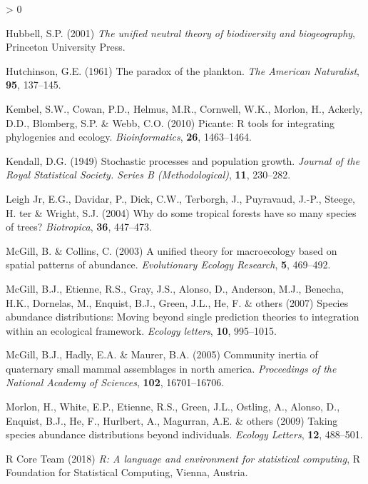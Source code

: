 \documentclass[
]{article}
\newlength{\cslhangindent}
\newenvironment{CSLReferences}[2] %
 {%
  \setlength{\parindent}{0pt}
  \ifodd #1 \everypar{\setlength{\hangindent}{\cslhangindent}}\ignorespaces\fi
  \ifnum #2 > 0
  \setlength{\parskip}{#2\baselineskip}
  \fi
 }%
 {}
\begin{document}
\begin{CSLReferences}{1}{0}
\leavevmode\hypertarget{ref-hubbell2001}{}%
Hubbell, S.P. (2001) \emph{The unified neutral theory of biodiversity
and biogeography}, Princeton University Press.

\leavevmode\hypertarget{ref-hutchinson1961}{}%
Hutchinson, G.E. (1961) The paradox of the plankton. \emph{The American
Naturalist}, \textbf{95}, 137--145.

\leavevmode\hypertarget{ref-picante}{}%
Kembel, S.W., Cowan, P.D., Helmus, M.R., Cornwell, W.K., Morlon, H.,
Ackerly, D.D., Blomberg, S.P. \& Webb, C.O. (2010) Picante: R tools for
integrating phylogenies and ecology. \emph{Bioinformatics}, \textbf{26},
1463--1464.

\leavevmode\hypertarget{ref-kendall1949}{}%
Kendall, D.G. (1949) Stochastic processes and population growth.
\emph{Journal of the Royal Statistical Society. Series B
(Methodological)}, \textbf{11}, 230--282.

\leavevmode\hypertarget{ref-leigh2004}{}%
Leigh Jr, E.G., Davidar, P., Dick, C.W., Terborgh, J., Puyravaud, J.-P.,
Steege, H. ter \& Wright, S.J. (2004) Why do some tropical forests have
so many species of trees? \emph{Biotropica}, \textbf{36}, 447--473.

\leavevmode\hypertarget{ref-mcgill2003}{}%
McGill, B. \& Collins, C. (2003) A unified theory for macroecology based
on spatial patterns of abundance. \emph{Evolutionary Ecology Research},
\textbf{5}, 469--492.

\leavevmode\hypertarget{ref-mcgill2007}{}%
McGill, B.J., Etienne, R.S., Gray, J.S., Alonso, D., Anderson, M.J.,
Benecha, H.K., Dornelas, M., Enquist, B.J., Green, J.L., He, F. \&
others (2007) Species abundance distributions: Moving beyond single
prediction theories to integration within an ecological framework.
\emph{Ecology letters}, \textbf{10}, 995--1015.

\leavevmode\hypertarget{ref-mcgill2005}{}%
McGill, B.J., Hadly, E.A. \& Maurer, B.A. (2005) Community inertia of
quaternary small mammal assemblages in north america. \emph{Proceedings
of the National Academy of Sciences}, \textbf{102}, 16701--16706.

\leavevmode\hypertarget{ref-morlon2009}{}%
Morlon, H., White, E.P., Etienne, R.S., Green, J.L., Ostling, A.,
Alonso, D., Enquist, B.J., He, F., Hurlbert, A., Magurran, A.E. \&
others (2009) Taking species abundance distributions beyond individuals.
\emph{Ecology Letters}, \textbf{12}, 488--501.

\leavevmode\hypertarget{ref-rcore}{}%
R Core Team (2018) \emph{R: A language and environment for statistical
computing}, R Foundation for Statistical Computing, Vienna, Austria.


\end{CSLReferences}
\end{document}

